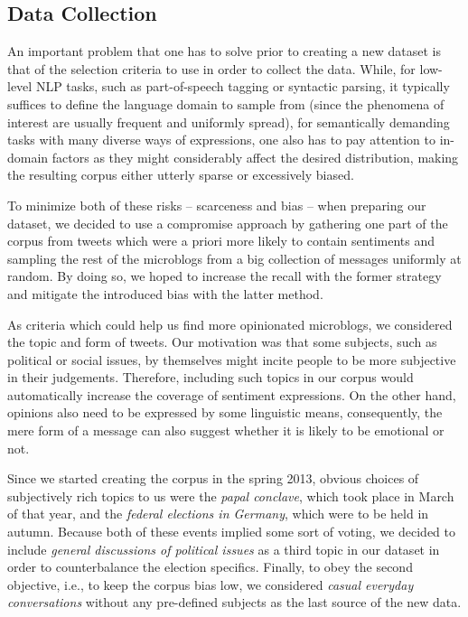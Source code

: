 \subsection{Data Collection}

An important problem that one has to solve prior to creating a new
dataset is that of the selection criteria to use in order to collect
the data.  While, for low-level NLP tasks, such as part-of-speech
tagging or syntactic parsing, it typically suffices to define the
language domain to sample from (since the phenomena of interest are
usually frequent and uniformly spread), for semantically demanding
tasks with many diverse ways of expressions, one also has to pay
attention to in-domain factors as they might considerably affect the
desired distribution, making the resulting corpus either utterly
sparse or excessively biased.

To minimize both of these risks -- scarceness and bias -- when
preparing our dataset, we decided to use a compromise approach by
gathering one part of the corpus from tweets which were a priori more
likely to contain sentiments and sampling the rest of the microblogs
from a big collection of messages uniformly at random.  By doing so,
we hoped to increase the recall with the former strategy and mitigate
the introduced bias with the latter method.

As criteria which could help us find more opinionated microblogs, we
considered the topic and form of tweets.  Our motivation was that some
subjects, such as political or social issues, by themselves might
incite people to be more subjective in their judgements.  Therefore,
including such topics in our corpus would automatically increase the
coverage of sentiment expressions.  On the other hand, opinions also
need to be expressed by some linguistic means, consequently, the mere
form of a message can also suggest whether it is likely to be
emotional or not.

Since we started creating the corpus in the spring 2013, obvious
choices of subjectively rich topics to us were the \emph{papal
  conclave}, which took place in March of that year, and the
\emph{federal elections in Germany}, which were to be held in autumn.
Because both of these events implied some sort of voting, we decided
to include \emph{general discussions of political issues} as a third
topic in our dataset in order to counterbalance the election
specifics.  Finally, to obey the second objective, i.e., to keep the
corpus bias low, we considered \emph{casual everyday conversations}
without any pre-defined subjects as the last source of the new data.

